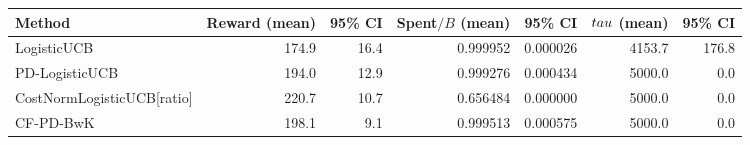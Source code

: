 \begin{tabular}{lrrrrrr}
\toprule
Method & Reward (mean) & 95\% CI & Spent$/B$ (mean) & 95\% CI & $\\tau$ (mean) & 95\% CI \\
\midrule
LogisticUCB & 174.9 & 16.4 & 0.999952 & 0.000026 & 4153.7 & 176.8 \\
PD-LogisticUCB & 194.0 & 12.9 & 0.999276 & 0.000434 & 5000.0 & 0.0 \\
CostNormLogisticUCB[ratio] & 220.7 & 10.7 & 0.656484 & 0.000000 & 5000.0 & 0.0 \\
CF-PD-BwK & 198.1 & 9.1 & 0.999513 & 0.000575 & 5000.0 & 0.0 \\
\bottomrule
\end{tabular}

